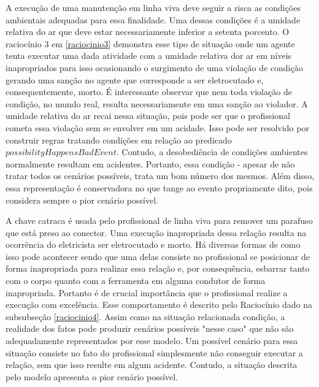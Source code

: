 A execução de uma manutenção em linha viva deve seguir a risca as condições ambientais adequadas para essa finalidade. Uma dessas condições é a umidade relativa do ar que deve estar necessariamente inferior a setenta porcento. O raciocínio 3 em \ref{raciocinio3} demonstra esse tipo de situação onde um agente tenta executar uma dada atividade com a umidade relativa dor ar em níveis inapropriados para isso ocasionando o surgimento de uma violação de condição gerando uma sanção no agente que corresponde a ser eletrocutado e, consequentemente, morto. É interessante observar que nem toda violação de condição, no mundo real, resulta necessariamente em uma sanção ao violador. A umidade relativa do ar recai nessa situação, pois pode ser que o profissional cometa essa violação sem se envolver em um acidade. Isso pode ser resolvido por construir regras tratando condições em relação ao predicado $possibilityHappensBadEvent$. Contudo, a desobediência de condições ambientes normalmente resultam em acidentes. Portanto, essa condição - apesar de não tratar todos os cenários possíveis, trata um bom número dos mesmos. Além disso, essa representação é conservadora no que tange ao evento propriamente dito, pois considera sempre o pior 
cenário possível.

A chave catraca é usada pelo profissional de linha viva para remover um parafuso que está preso ao conector. Uma execução inapropriada dessa relação resulta na ocorrência do eletricista ser eletrocutado e morto. Há diversas formas de como isso pode acontecer sendo que uma delas consiste no profissional se posicionar de forma inapropriada para realizar essa relação e, por consequência, esbarrar tanto com o corpo quanto com a ferramenta em alguma condutor de forma inapropriada. Portanto é de crucial importância que o profissional realize a execução com excelência. Esse comportamento é descrito pelo Raciocínio dado na subsubseção \ref{raciocinio4}. Assim como na situação relacionada condição, a realidade dos fatos pode produzir cenários possíveis "nesse caso" que não são adequadamente representados por esse modelo. Um possível cenário para essa situação consiste no fato do profissional simplesmente não conseguir executar a relação, sem que isso resulte em algum acidente. Contudo, a situação descrita pelo modelo apresenta o pior cenário possível. 

